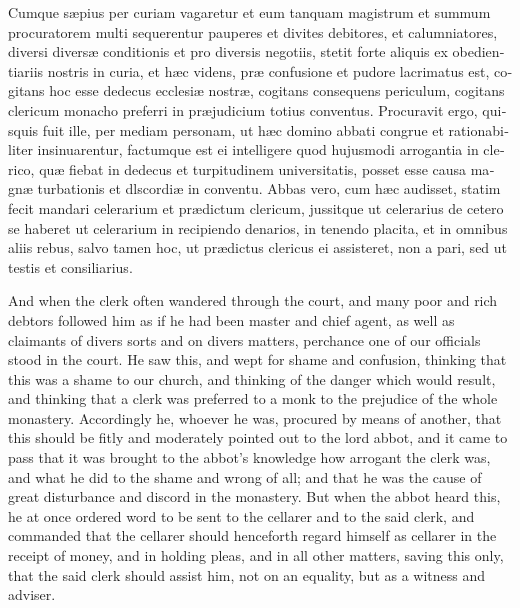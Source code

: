 \documentclass{book}
\begin{document}
\begin{paracol}{2}
\switchcolumn*

\begin{otherlanguage}{latin}
Cumque s\ae{}pius per curiam vagaretur et eum tanquam magistrum et summum procuratorem multi sequerentur pauperes et divites debitores, et calumniatores, diversi divers\ae{} conditionis et pro diversis negotiis, stetit forte aliquis ex obedientiariis nostris in curia, et h\ae{}c videns, pr\ae{} confusione et pudore lacrimatus est, cogitans hoc esse dedecus ecclesi\ae{} nostr\ae{}, cogitans consequens periculum, cogitans clericum monacho preferri in pr\ae{}judicium totius conventus. Procuravit ergo, quisquis fuit ille, per mediam personam, ut h\ae{}c domino abbati congrue et rationabiliter insinuarentur, factumque est ei intelligere quod hujusmodi arrogantia in clerico, qu\ae{} fiebat in dedecus et turpitudinem universitatis, posset esse causa magn\ae{} turbationis et dlscordi\ae{} in conventu. Abbas vero, cum h\ae{}c audisset, statim fecit mandari celerarium et pr\ae{}dictum clericum, jussitque ut celerarius de cetero se haberet ut celerarium in recipiendo denarios, in tenendo placita, et in omnibus aliis rebus, salvo tamen hoc, ut pr\ae{}dictus clericus ei assisteret, non a pari, sed ut testis et consiliarius.
\end{otherlanguage}

\switchcolumn

And when the clerk often wandered through the court, and many poor and rich debtors followed him as if he had been master and chief agent, as well as claimants of divers sorts and on divers matters, perchance one of our officials stood in the court. He saw this, and wept for shame and confusion, thinking that this was a shame to our church, and thinking of the danger which would result, and thinking that a clerk was preferred to a monk to the prejudice of the whole monastery. Accordingly he, whoever he was, procured by means of another, that this should be fitly and moderately pointed out to the lord abbot, and it came to pass that it was brought to the abbot's knowledge how arrogant the clerk was, and what he did to the shame and wrong of all; and that he was the cause of great disturbance and discord in the monastery. But when the abbot heard this, he at once ordered word to be sent to the cellarer and to the said clerk, and commanded that the cellarer should henceforth regard himself as cellarer in the receipt of money, and in holding pleas, and in all other matters, saving this only, that the said clerk should assist him, not on an equality, but as a witness and adviser.


\end{paracol}
\end{document}
